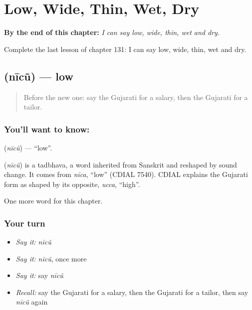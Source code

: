 
\chapter{Low, Wide, Thin, Wet, Dry}
\label{ch:gu-low-wide-thin-wet-dry}

\begin{chapteropening}
\textbf{By the end of this chapter:} \emph{I can say low, wide, thin, wet and dry.}

Complete the last lesson of chapter 131: I can say low, wide, thin, wet and dry.
\end{chapteropening}

\section[\texorpdfstring{\gu{નીચું} (nīcũ)}{નીચું (nīcũ)}]{ (nīcũ) — low}

\label{lesson:GU-C131-nicu}



\begin{quote}
Before the new one: say the Gujarati for a salary, then the Gujarati for a tailor.
\end{quote}

\subsection*{You'll want to know: }
\textbf{} (\emph{nīcũ}) — \textquotedblleft{}low\textquotedblright{}.

\begin{cousinweb}
\textbf{} (\emph{nīcũ}) is a tadbhava, a word inherited from Sanskrit and reshaped by sound change. It comes from \emph{nīca}, \textquotedblleft{}low\textquotedblright{} (CDIAL 7540). CDIAL explains the Gujarati form as shaped by its opposite, \emph{ucca}, \textquotedblleft{}high\textquotedblright{}.
\end{cousinweb}

\begin{grammarlens}[title={What you've built}]
One more word for this chapter.
\end{grammarlens}

\subsection*{Your turn}
\begin{itemize}
\raggedright
  \item \emph{Say it:} \emph{nīcũ}
  \item \emph{Say it:} \emph{nīcũ}, once more
  \item \emph{Say it:} say \emph{nīcũ}
  \item \emph{Recall:} say the Gujarati for a salary, then the Gujarati for a tailor, then say \emph{nīcũ} again
\end{itemize}

